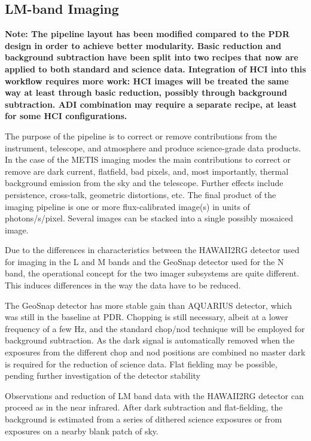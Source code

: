 \subsection{LM-band Imaging}
\label{ssec:overview_imaging}

\textbf{Note: The pipeline layout has been modified compared to the
  PDR design in order to achieve better modularity. Basic reduction
  and background subtraction have been split into two recipes that now
  are applied to both standard and science data. Integration of HCI
  into this workflow requires more work: HCI images will be treated
  the same way at least through basic reduction, possibly through
  background subtraction. ADI combination may require a separate
  recipe, at least for some HCI configurations.}

The purpose of the pipeline is to correct or remove contributions from
the instrument, telescope, and atmosphere and produce science-grade
data products.  In the case of the METIS imaging modes the main
contributions to correct or remove are dark current, flatfield, bad
pixels, and, most importantly, thermal background emission from the
sky and the telescope. Further effects include persistence,
cross-talk, geometric distortions, etc. The final product of the
imaging pipeline is one or more flux-calibrated image(s) in units of
photons/s/pixel. Several images can be stacked into a single possibly
mosaiced image.

Due to the differences in characteristics between the HAWAII2RG
detector used for imaging in the L and M bands and the GeoSnap
detector used for the N band, the operational concept for the two
imager subsystems are quite different. This induces differences in the
way the data have to be reduced.

The GeoSnap detector has more stable gain than AQUARIUS detector,
which was still in the baseline at PDR.  Chopping is still necessary,
albeit at a lower frequency of a few Hz, and the standard chop/nod
technique will be employed for background subtraction.  As the dark
signal is automatically removed when the exposures from the different
chop and nod positions are combined no master dark is required for the
reduction of science data. Flat fielding may be possible, pending
further investigation of the detector stability

Observations and reduction of LM band data with the HAWAII2RG detector
can proceed as in the near infrared. After dark subtraction and
flat-fielding, the background is estimated from a series of dithered
science exposures or from exposures on a nearby blank patch of sky.

